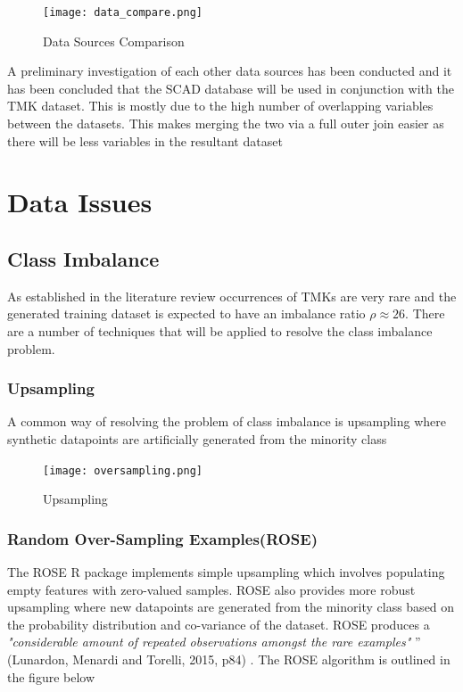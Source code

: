 \begin{figure}[h]
\centering
\texttt{[image: data\_compare.png]}
\caption{Data Sources Comparison}
\end{figure}

A preliminary investigation of each other data sources has been conducted and it has been concluded that the SCAD database will be used in conjunction with the TMK dataset. This is mostly due to the high number of overlapping variables between the datasets. This makes merging the two via a full outer join easier as there will be less variables in the resultant dataset
\section{Data Issues}
\subsection{Class Imbalance}
As established in the literature review occurrences of TMKs are very rare and the generated training dataset is expected to have an imbalance ratio $\rho \approx  26$. There are a number of techniques that will be applied to resolve the class imbalance problem.

\subsubsection{Upsampling}
A common way of resolving the problem of class imbalance is upsampling where synthetic datapoints are artificially generated from the minority class

\begin{figure}[h]
\centering
\texttt{[image: oversampling.png]}
\caption{Upsampling}
\end{figure}

\subsubsection{Random Over-Sampling Examples(ROSE)}

The ROSE R package implements simple upsampling which involves populating empty features with zero-valued samples. ROSE also provides more robust upsampling where new datapoints are generated from the minority class based on the probability distribution and co-variance of the dataset. ROSE produces a \emph{"considerable amount of repeated observations amongst the rare examples"} ” (Lunardon, Menardi and Torelli, 2015, p84) \cite{Lunardo}. The ROSE algorithm is outlined in the figure below

